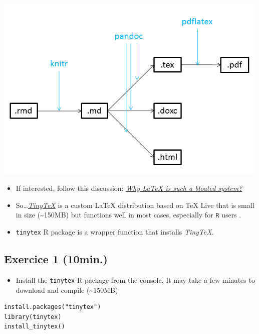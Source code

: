 \documentclass[]{article}
\providecommand{\tightlist}{%
  \setlength{\itemsep}{0pt}\setlength{\parskip}{0pt}}
\begin{document}
\includegraphics[width=5.20833in,height=\textheight]{../figures/pandoc1.png}

\begin{itemize}
\item
  If interested, follow this discussion:
  \href{https://ubuntuforums.org/showthread.php?t=395863}{\emph{Why
  LaTeX is such a bloated system?}}
\item
  So\ldots{}\href{https://yihui.name/tinytex/r/}{\emph{TinyTeX}} is a
  custom LaTeX distribution based on TeX Live that is small in size
  (\textasciitilde{}150MB) but functions well in most cases, especially
  for \texttt{R} users .
\item
  \texttt{tinytex} R package is a wrapper function that installs
  \emph{TinyTeX}.
\end{itemize}

\hypertarget{exercice-1-10min.}{%
\subsection{Exercice 1 (10min.)}\label{exercice-1-10min.}}

\begin{itemize}
\tightlist
\item
  Install the \texttt{tinytex} R package from the console. It may take a
  few minutes to download and compile (\textasciitilde{}150MB)
\end{itemize}

\begin{verbatim}
install.packages("tinytex")  
library(tinytex)  
install_tinytex()  
\end{verbatim}
\end{document}
